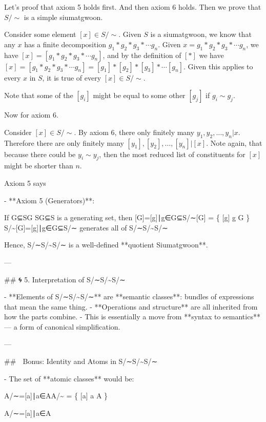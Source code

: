         Let’s proof that axiom 5 holds first. And then axiom 6 holds. Then we prove that $S/\sim$ is a simple siumatgwoon.
        
        Consider some element $[x] \in S/\sim$. Given $S$ is a siumatgwoon, we know that any $x$ has a finite decomposition $g_1 * g_2 * g_3 * \cdots g_n$. Given $x=g_1 * g_2 * g_3 * \cdots g_n$, we have $[x]=[g_1 * g_2 * g_3 * \cdots g_n]$, and by the definition of $[*]$ we have $[x]=[g_1 * g_2 * g_3 * \cdots g_n]=[g_1] * [g_2] * [g_3] * \cdots [g_n]$. Given this applies to every $x$ in $S$, it is true of every $[x]\in S/\sim$. 
        
        Note that some of the $[g_i]$ might be equal to some other $[g_j]$ if $g_i \sim g_j$.
        
        Now for axiom 6.
        
        Consider $[x]\in S/\sim$. By axiom 6, there only finitely many $y_1, y_2, \ldots, y_n | x.$ Therefore there are only finitely many $[y_1], [y_2], \ldots, [y_n] | [x].$ Note again, that because there could be $y_i \sim y_j$, then the most reduced list of constituents for $[x]$ might be shorter than $n$.
        
        Axiom 5 says
        
    - **Axiom 5 (Generators)**:
        
        If G⊆SG \subseteq SG⊆S is a generating set, then [G]={[g]∣g∈G}⊆S/∼[G] = \{ [g] \mid g \in G \} \subseteq S/{\sim}[G]={[g]∣g∈G}⊆S/∼ generates all of S/∼S/{\sim}S/∼
        
    
    Hence, S/∼S/{\sim}S/∼ is a well-defined **quotient Siumatgwoon**.
    
    ---
    
    ## 🌀 5. Interpretation of S/∼S/{\sim}S/∼
    
    - **Elements of S/∼S/{\sim}S/∼** are **semantic classes**: bundles of expressions that mean the same thing.
    - **Operations and structure** are all inherited from how the parts combine.
    - This is essentially a move from **syntax to semantics** — a form of canonical simplification.
    
    ---
    
    ## 🧠 Bonus: Identity and Atoms in S/∼S/{\sim}S/∼
    
    - The set of **atomic classes** would be:
    
    A/∼={[a]∣a∈A}A/{\sim} = \{ [a] \mid a \in A \}
    
    A/∼={[a]∣a∈A}
    
